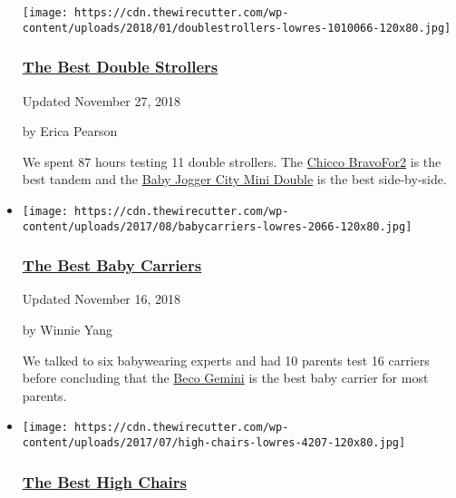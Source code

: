 \begin{itemize}
  \texttt{[image: https://cdn.thewirecutter.com/wp-content/uploads/2018/01/doublestrollers-lowres-1010066-120x80.jpg]}

  \hypertarget{the-best-double-strollers}{%
  \subsubsection{\texorpdfstring{\href{https://www.nytimes3xbfgragh.onion/wirecutter/reviews/best-double-strollers/}{The
  Best Double
  Strollers}}{The Best Double Strollers}}\label{the-best-double-strollers}}

  Updated November 27, 2018

  by Erica Pearson

  We spent 87 hours testing 11 double strollers. The
  \href{https://www.nytimes3xbfgragh.onion/wirecutter/out/link/24706/155472/4/70788/?merchant=BuyBuy\%20Baby}{Chicco
  BravoFor2} is the best tandem and the
  \href{https://www.nytimes3xbfgragh.onion/wirecutter/out/link/24707/0/4/70789/}{Baby
  Jogger City Mini Double} is the best side-by-side.
\item
  \href{https://www.nytimes3xbfgragh.onion/wirecutter/reviews/best-baby-carriers/}{}

  \texttt{[image: https://cdn.thewirecutter.com/wp-content/uploads/2017/08/babycarriers-lowres-2066-120x80.jpg]}

  \hypertarget{the-best-baby-carriers}{%
  \subsubsection{\texorpdfstring{\href{https://www.nytimes3xbfgragh.onion/wirecutter/reviews/best-baby-carriers/}{The
  Best Baby
  Carriers}}{The Best Baby Carriers}}\label{the-best-baby-carriers}}

  Updated November 16, 2018

  by Winnie Yang

  We talked to six babywearing experts and had 10 parents test 16
  carriers before concluding that the
  \href{https://www.nytimes3xbfgragh.onion/wirecutter/out/link/20297/0/4/48775/}{Beco
  Gemini} is the best baby carrier for most parents.
\item
  \href{https://www.nytimes3xbfgragh.onion/wirecutter/reviews/best-high-chairs/}{}

  \texttt{[image: https://cdn.thewirecutter.com/wp-content/uploads/2017/07/high-chairs-lowres-4207-120x80.jpg]}

  \hypertarget{the-best-high-chairs}{%
  \subsubsection{\texorpdfstring{\href{https://www.nytimes3xbfgragh.onion/wirecutter/reviews/best-high-chairs/}{The
  Best High Chairs}}{The Best High Chairs}}\label{the-best-high-chairs}}


\end{itemize}
